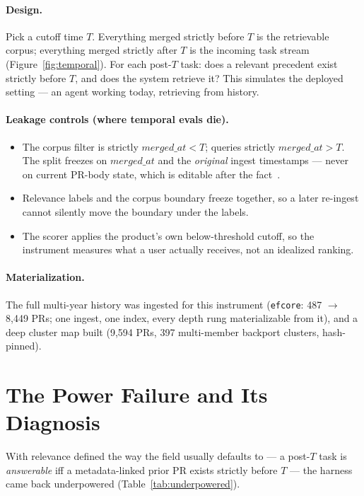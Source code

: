 \documentclass[sigconf,nonacm]{acmart}
\begin{document}
\paragraph{Design.}
Pick a cutoff time $T$. Everything merged strictly before $T$ is the
retrievable corpus; everything merged strictly after $T$ is the incoming
task stream (Figure~\ref{fig:temporal}). For each post-$T$ task: does a
relevant precedent exist strictly before $T$, and does the system retrieve
it? This simulates the deployed setting --- an agent working today,
retrieving from history.

\paragraph{Leakage controls (where temporal evals die).}
\begin{itemize}
  \item The corpus filter is strictly $\mathit{merged\_at} < T$; queries
    strictly $\mathit{merged\_at} > T$. The split freezes on
    $\mathit{merged\_at}$ and the \emph{original} ingest timestamps ---
    never on current PR-body state, which is editable after the
    fact~\cite{kalliamvakou2014promises}.
  \item Relevance labels and the corpus boundary freeze together, so a
    later re-ingest cannot silently move the boundary under the labels.
  \item The scorer applies the product's own below-threshold cutoff, so
    the instrument measures what a user actually receives, not an
    idealized ranking.
\end{itemize}

\paragraph{Materialization.}
The full multi-year history was ingested for this instrument
(\texttt{efcore}: 487 $\rightarrow$ 8{,}449 PRs; one ingest, one index,
every depth rung materializable from it), and a deep cluster map built
(9{,}594 PRs, 397 multi-member backport clusters, hash-pinned).

\section{The Power Failure and Its Diagnosis}
\label{sec:power}

With relevance defined the way the field usually defaults to --- a
post-$T$ task is \emph{answerable} iff a metadata-linked prior PR exists
strictly before $T$ --- the harness came back underpowered
(Table~\ref{tab:underpowered}).
\end{document}
